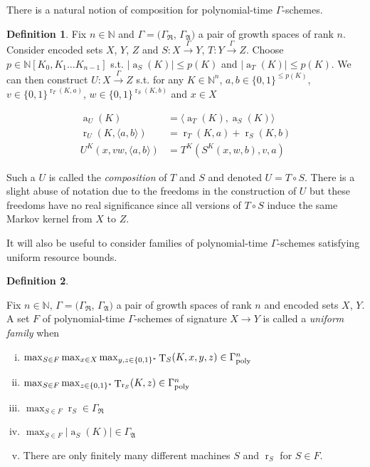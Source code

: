 \documentclass[11pt]{article}
\numberwithin{equation}{section}
\theoremstyle{definition}
\newtheorem{definition}{Definition}[section]
\theoremstyle{plain}
\newcommand{\Bool}{\{0,1\}}
\newcommand{\Words}{{\Bool^*}}
\DeclareMathOperator{\T}{T}
\DeclareMathOperator{\R}{r}
\DeclareMathOperator{\A}{a}
\newcommand{\Nats}{\mathbb{N}}
\newcommand{\NatPoly}{\Nats[K_0, K_1 \ldots K_{n-1}]}
\newcommand{\Abs}[1]{\lvert #1 \rvert}
\newcommand{\Chev}[1]{\langle #1 \rangle}
\newcommand{\GrowR}{\Gamma_{\mathfrak{R}}}
\newcommand{\GrowA}{\Gamma_{\mathfrak{A}}}
\newcommand{\GammaPoly}{\Gamma_{\textnormal{poly}}}
\newcommand{\Scheme}{\xrightarrow{\Gamma}}
\begin{document}
There is a natural notion of composition for polynomial-time $\Gamma$-schemes.

\begin{samepage}
\begin{definition}

Fix $n \in \Nats$ and $\Gamma=(\GrowR$, $\GrowA)$ a pair of growth spaces of rank $n$. Consider encoded sets $X$, $Y$, $Z$ and $S: X \Scheme Y$, $T: Y \Scheme Z$. Choose $p \in \NatPoly$ s.t. $\Abs{\A_S(K)} \leq p(K)$ and $\Abs{\A_T(K)} \leq p(K)$. We can then construct $U: X \Scheme Z$ s.t. for any $K \in \Nats^n$, $a,b \in \Bool^{\leq p(K)}$, ${v \in \Bool^{\R_T(K,a)}}$, ${w \in \Bool^{\R_S(K,b)}}$ and $x \in X$

\begin{align}
\A_U(K) &= \Chev{\A_T(K),\A_S(K)} \\
\R_U(K, \Chev{a,b}) &= \R_T(K,a)+\R_S(K,b) \\
U^K(x,vw,\Chev{a,b}) &= T^K(S^K(x,w,b),v,a)
\end{align}

Such a $U$ is called the \emph{composition} of $T$ and $S$ and denoted $U = T \circ S$. There is a slight abuse of notation due to the freedoms in the construction of $U$ but these freedoms have no real significance since all versions of $T \circ S$ induce the same Markov kernel from $X$ to $Z$.

\end{definition}
\end{samepage}

It will also be useful to consider families of polynomial-time $\Gamma$-schemes satisfying uniform resource bounds.

\begin{definition}
\label{def:family}

Fix $n \in \Nats$, $\Gamma=(\GrowR$, $\GrowA)$ a pair of growth spaces of rank $n$ and encoded sets $X$, $Y$. A set $F$ of polynomial-time $\Gamma$-schemes of signature $X \rightarrow Y$ is called a \emph{uniform family} when

\begin{enumerate}[(i)]

\item\label{con:def__family__time} $\max_{S \in F} \max_{x \in X} \max_{y,z \in \Words} \T_S(K,x,y,z) \in \GammaPoly^n$

\item\label{con:def__family__rtime} $\max_{S \in F} \max_{z \in \Words} \T_{\R_S}(K,z) \in \GammaPoly^n$

\item\label{con:def__family__rand} $\max_{S \in F} \R_S \in \GrowR$

\item\label{con:def__family__adv} $\max_{S \in F} \Abs{\A_S(K)} \in \GrowA$

\item There are only finitely many different machines ${S}$ and ${\R_S}$ for ${S \in F}$.

\end{enumerate}

\end{definition}
\end{document}
